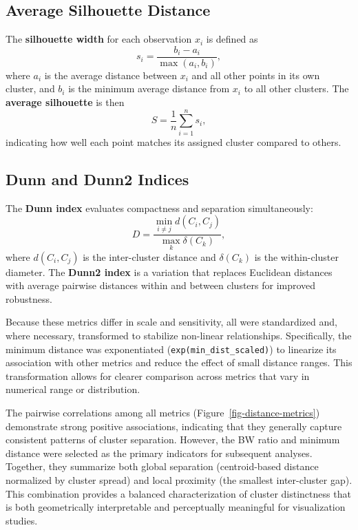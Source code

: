 \documentclass[
  11pt,
  a4paper,
]{report}
\begin{document}
\subsection{Average Silhouette
Distance}\label{average-silhouette-distance}

The \textbf{silhouette width} for each observation \(x_i\) is defined as
\[
s_i = \frac{b_i - a_i}{\max(a_i, b_i)},
\] where \(a_i\) is the average distance between \(x_i\) and all other
points in its own cluster, and \(b_i\) is the minimum average distance
from \(x_i\) to all other clusters. The \textbf{average silhouette} is
then \[
S = \frac{1}{n} \sum_{i=1}^{n} s_i,
\] indicating how well each point matches its assigned cluster compared
to others.

\subsection{Dunn and Dunn2 Indices}\label{dunn-and-dunn2-indices}

The \textbf{Dunn index} evaluates compactness and separation
simultaneously: \[
D = \frac{\min_{i \neq j} d(C_i, C_j)}{\max_{k} \delta(C_k)},
\] where \(d(C_i, C_j)\) is the inter-cluster distance and
\(\delta(C_k)\) is the within-cluster diameter. The \textbf{Dunn2 index}
is a variation that replaces Euclidean distances with average pairwise
distances within and between clusters for improved robustness.

Because these metrics differ in scale and sensitivity, all were
standardized and, where necessary, transformed to stabilize non-linear
relationships. Specifically, the minimum distance was exponentiated
(\texttt{exp(min\_dist\_scaled)}) to linearize its association with
other metrics and reduce the effect of small distance ranges. This
transformation allows for clearer comparison across metrics that vary in
numerical range or distribution.

The pairwise correlations among all metrics
(Figure~\ref{fig-distance-metrics}) demonstrate strong positive
associations, indicating that they generally capture consistent patterns
of cluster separation. However, the BW ratio and minimum distance were
selected as the primary indicators for subsequent analyses. Together,
they summarize both global separation (centroid-based distance
normalized by cluster spread) and local proximity (the smallest
inter-cluster gap). This combination provides a balanced
characterization of cluster distinctness that is both geometrically
interpretable and perceptually meaningful for visualization studies.
\end{document}
